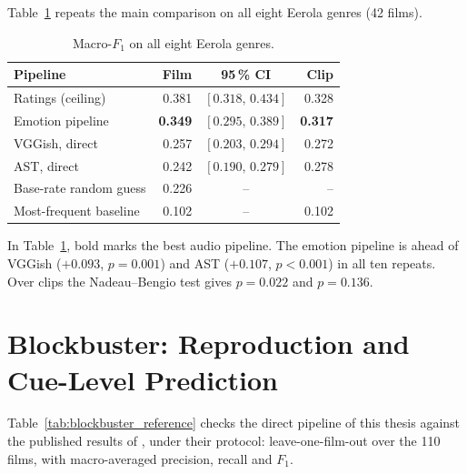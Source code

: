 Table~\ref{tab:app_eight} repeats the main comparison on all eight Eerola genres
(42 films).

\begin{table}[H]
  \centering
  \small
  \caption{Macro-$F_1$ on all eight Eerola genres.}
  \label{tab:app_eight}
  \begin{tabular}{lrcr}
    \toprule
    Pipeline & Film & 95\,\% CI & Clip \\
    \midrule
    Ratings (ceiling)          & 0.381 & $[0.318,\,0.434]$ & 0.328 \\
    Emotion pipeline           & \textbf{0.349} & $[0.295,\,0.389]$ & \textbf{0.317} \\
    VGGish, direct             & 0.257 & $[0.203,\,0.294]$ & 0.272 \\
    AST, direct                & 0.242 & $[0.190,\,0.279]$ & 0.278 \\
    \midrule
    Base-rate random guess     & 0.226 & -- & -- \\
    Most-frequent baseline     & 0.102 & -- & 0.102 \\
    \bottomrule
  \end{tabular}
\end{table}

In Table~\ref{tab:app_eight}, bold marks the best audio pipeline. The emotion pipeline is
ahead of VGGish ($+0.093$, $p=0.001$) and AST ($+0.107$, $p<0.001$) in all ten repeats. Over clips the Nadeau--Bengio test gives $p=0.022$ and $p=0.136$.

\section{Blockbuster: Reproduction and Cue-Level Prediction}
\label{sec:app_blockbuster}

Table~\ref{tab:blockbuster_reference} checks the direct pipeline of this thesis against the
published results of \citet{ma2021computational}, under their protocol: leave-one-film-out
over the 110 films, with macro-averaged precision, recall and $F_1$.

